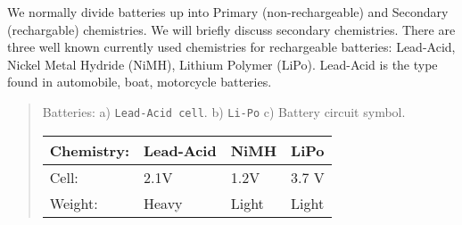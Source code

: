 We normally divide batteries up into Primary (non-rechargeable) and
Secondary (rechargable) chemistries. We will briefly discuss secondary
chemistries. There are three well known currently used chemistries for
rechargeable batteries: Lead-Acid, Nickel Metal Hydride (NiMH), Lithium
Polymer (LiPo). Lead-Acid is the type found in automobile, boat,
motorcycle batteries.

\begin{quote}
Batteries: a) \texttt{Lead-Acid\ cell}. b) \texttt{Li-Po} c) Battery
circuit symbol.

\begin{longtable}[]{@{}llll@{}}
\toprule
\begin{minipage}[b]{0.22\columnwidth}\raggedright
Chemistry:\strut
\end{minipage} & \begin{minipage}[b]{0.15\columnwidth}\raggedright
Lead-Acid\strut
\end{minipage} & \begin{minipage}[b]{0.23\columnwidth}\raggedright
NiMH\strut
\end{minipage} & \begin{minipage}[b]{0.23\columnwidth}\raggedright
LiPo\strut
\end{minipage}\tabularnewline
\midrule
\endhead
\begin{minipage}[t]{0.22\columnwidth}\raggedright
Cell:\strut
\end{minipage} & \begin{minipage}[t]{0.15\columnwidth}\raggedright
2.1V\strut
\end{minipage} & \begin{minipage}[t]{0.23\columnwidth}\raggedright
1.2V\strut
\end{minipage} & \begin{minipage}[t]{0.23\columnwidth}\raggedright
3.7 V\strut
\end{minipage}\tabularnewline
\begin{minipage}[t]{0.22\columnwidth}\raggedright
Weight:\strut
\end{minipage} & \begin{minipage}[t]{0.15\columnwidth}\raggedright
Heavy\strut
\end{minipage} & \begin{minipage}[t]{0.23\columnwidth}\raggedright
Light\strut
\end{minipage} & \begin{minipage}[t]{0.23\columnwidth}\raggedright
Light\strut
\end{minipage}\tabularnewline

\end{longtable}
\end{quote}
